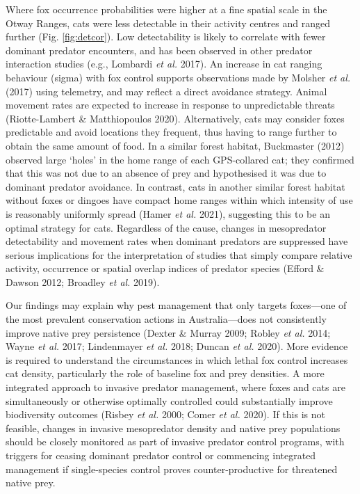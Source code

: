 \documentclass[preprint, 3p, authoryear]{elsarticle} %
\begin{document}
Where fox occurrence probabilities were higher at a fine spatial scale in the Otway Ranges, cats were less detectable in their activity centres and ranged further (Fig. \ref{fig:detcor}). Low detectability is likely to correlate with fewer dominant predator encounters, and has been observed in other predator interaction studies (e.g., Lombardi \emph{et al.} 2017). An increase in cat ranging behaviour (sigma) with fox control supports observations made by Molsher \emph{et al.} (2017) using telemetry, and may reflect a direct avoidance strategy. Animal movement rates are expected to increase in response to unpredictable threats (Riotte-Lambert \& Matthiopoulos 2020). Alternatively, cats may consider foxes predictable and avoid locations they frequent, thus having to range further to obtain the same amount of food. In a similar forest habitat, Buckmaster (2012) observed large `holes' in the home range of each GPS-collared cat; they confirmed that this was not due to an absence of prey and hypothesised it was due to dominant predator avoidance. In contrast, cats in another similar forest habitat without foxes or dingoes have compact home ranges within which intensity of use is reasonably uniformly spread (Hamer \emph{et al.} 2021), suggesting this to be an optimal strategy for cats. Regardless of the cause, changes in mesopredator detectability and movement rates when dominant predators are suppressed have serious implications for the interpretation of studies that simply compare relative activity, occurrence or spatial overlap indices of predator species (Efford \& Dawson 2012; Broadley \emph{et al.} 2019).

Our findings may explain why pest management that only targets foxes---one of the most prevalent conservation actions in Australia---does not consistently improve native prey persistence (Dexter \& Murray 2009; Robley \emph{et al.} 2014; Wayne \emph{et al.} 2017; Lindenmayer \emph{et al.} 2018; Duncan \emph{et al.} 2020). More evidence is required to understand the circumstances in which lethal fox control increases cat density, particularly the role of baseline fox and prey densities. A more integrated approach to invasive predator management, where foxes and cats are simultaneously or otherwise optimally controlled could substantially improve biodiversity outcomes (Risbey \emph{et al.} 2000; Comer \emph{et al.} 2020). If this is not feasible, changes in invasive mesopredator density and native prey populations should be closely monitored as part of invasive predator control programs, with triggers for ceasing dominant predator control or commencing integrated management if single-species control proves counter-productive for threatened native prey.
\end{document}
